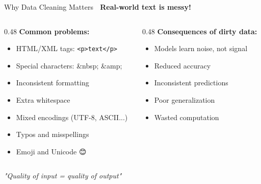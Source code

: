 \documentclass[aspectratio=169]{beamer}
\begin{document}
\begin{frame}[shrink=10]{Why Data Cleaning Matters 📝}
    \textbf{Real-world text is messy!}

    \begin{columns}[T]
        \begin{column}{0.48\textwidth}
            \textbf{Common problems:}
            \begin{itemize}\setlength{\itemsep}{0pt}
                \item HTML/XML tags: \texttt{<p>text</p>}
                \item Special characters: \&nbsp; \&amp;
                \item Inconsistent formatting
                \item Extra whitespace
                \item Mixed encodings (UTF-8, ASCII...)
                \item Typos and misspellings
                \item Emoji and Unicode 😊🎉
            \end{itemize}
        \end{column}
        \begin{column}{0.48\textwidth}
            \textbf{Consequences of dirty data:}
            \begin{itemize}\setlength{\itemsep}{0pt}
                \item Models learn noise, not signal
                \item Reduced accuracy
                \item Inconsistent predictions
                \item Poor generalization
                \item Wasted computation
            \end{itemize}
        \end{column}
    \end{columns}

    \vspace{1em}
    \begin{center}
        \textit{"Quality of input = quality of output"}
    \end{center}
\end{frame}
\end{document}
